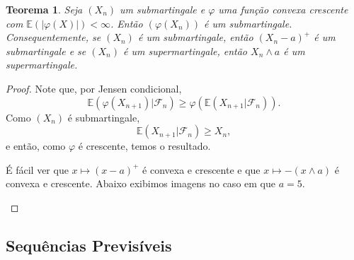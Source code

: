 \documentclass[12pt,a4paper,oneside]{book}
\newtheorem{theorem}{Teorema}[section]
\theoremstyle{definition}
\theoremstyle{remark}
\numberwithin{equation}{section}
\newcommand{\E}{\mathbb{E}}
\newcommand{\F}{\mathcal{F}}
\begin{document}
\begin{theorem}
Seja $(X_n)$ um submartingale e $\varphi$ uma função convexa crescente com $\E(|\varphi(X)|)<\infty$. Então $(\varphi(X_n))$ é um submartingale. Consequentemente, 
se $(X_n)$ é um submartingale, então $(X_n-a)^+$ é um submartingale e se $(X_n)$ é um supermartingale, então $X_n\wedge a$ é um supermartingale.
\end{theorem}
\begin{proof}
Note que, por Jensen condicional,
$$\E(\varphi(X_{n+1})|\F_n) \geq \varphi(\E(X_{n+1}|\F_n)) .$$
Como $(X_n)$ é submartingale,
$$\E(X_{n+1}|\F_n)\geq X_{n}, $$
e então, como $\varphi$ é crescente, temos o resultado.

É fácil ver que $x\mapsto (x-a)^+$ é convexa e crescente e que $x\mapsto -(x\wedge a)$ é convexa e crescente. Abaixo exibimos imagens no caso em que $a=5.$


\begin{figure}[h]
\centering
    \label{fig:example}%
\end{figure}

\end{proof}


\subsection{Sequências Previsíveis }
\end{document}
